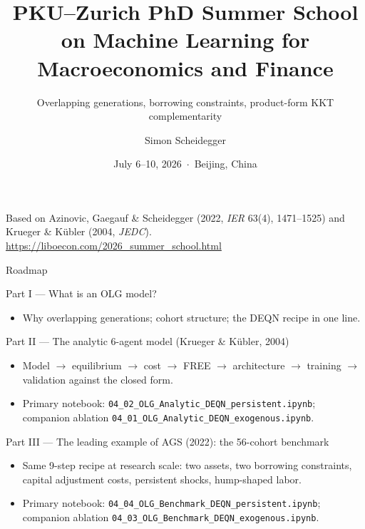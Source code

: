\documentclass[aspectratio=169,11pt]{beamer}
\title[PKU--Zurich Summer School 2026]
{PKU--Zurich PhD Summer School on Machine Learning for Macroeconomics and Finance}
\subtitle{Overlapping generations, borrowing constraints, product-form KKT complementarity}
\author{Simon Scheidegger}
\institute{HEC Lausanne $\cdot$ University of Zurich}
\date{July 6--10, 2026 \,$\cdot$\, Beijing, China}
\begin{document}
{
\begin{frame}
\titlepage
\vspace{-0.4cm}
\begin{center}
{\footnotesize Based on Azinovic, Gaegauf \& Scheidegger (2022, \emph{IER} 63(4), 1471--1525) and Krueger \& K\"ubler (2004, \emph{JEDC}).}\\[8pt]
{\footnotesize \url{https://liboecon.com/2026_summer_school.html}}
\end{center}
\end{frame}
}

\begin{frame}{Roadmap}
\footnotesize
\begin{block}{Part I --- What is an OLG model?}
\vspace{-3pt}\begin{itemize}\itemsep0pt
    \item Why overlapping generations; cohort structure; the DEQN recipe in one line.
\end{itemize}
\end{block}
\vspace{-2pt}
\begin{block}{Part II --- The analytic 6-agent model (Krueger \& K\"ubler, 2004)}
\vspace{-3pt}\begin{itemize}\itemsep0pt
    \item Model $\to$ equilibrium $\to$ cost $\to$ FREE $\to$ architecture $\to$ training $\to$ validation against the closed form.
    \item Primary notebook: \texttt{04\_02\_OLG\_Analytic\_DEQN\_persistent.ipynb}; companion ablation \texttt{04\_01\_OLG\_Analytic\_DEQN\_exogenous.ipynb}.
\end{itemize}
\end{block}
\vspace{-2pt}
\begin{block}{Part III --- The leading example of AGS (2022): the 56-cohort benchmark}
\vspace{-3pt}\begin{itemize}\itemsep0pt
    \item Same 9-step recipe at research scale: two assets, two borrowing constraints, capital adjustment costs, persistent shocks, hump-shaped labor.
    \item Primary notebook: \texttt{04\_04\_OLG\_Benchmark\_DEQN\_persistent.ipynb}; companion ablation \texttt{04\_03\_OLG\_Benchmark\_DEQN\_exogenous.ipynb}.
\end{itemize}
\end{block}
\end{frame}
\end{document}

